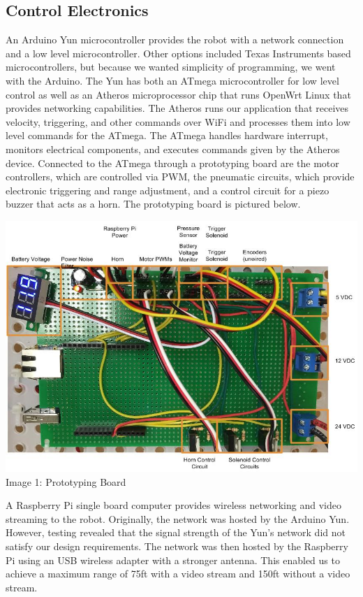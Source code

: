 \documentclass[letterpaper,12pt]{article}
\begin{document}
\subsection{Control Electronics}
An Arduino Yun microcontroller provides the robot with a network connection and
a low level microcontroller. Other options included Texas Instruments based
microcontrollers, but because we wanted simplicity of programming, we went with
the Arduino. The Yun has both an ATmega microcontroller for low level control
as well as an Atheros microprocessor chip that runs OpenWrt Linux that provides
networking capabilities. The Atheros runs our application that receives
velocity, triggering, and other commands over WiFi and processes them into low
level commands for the ATmega. The ATmega handles hardware interrupt, monitors
electrical components, and executes commands given by the Atheros device.
Connected to the ATmega through a prototyping board are the motor controllers,
which are controlled via PWM, the pneumatic circuits, which provide electronic
triggering and range adjustment, and a control circuit for a piezo buzzer that
acts as a horn. The prototyping board is pictured below.\\
\begin{center}
    \includegraphics[width=15cm]{./pics/electronics/AnnotatedProtoboard.jpg}\\
     Image 1: Prototyping Board
\end{center}

A Raspberry Pi single board computer provides wireless networking and video
streaming to the robot. Originally, the network was hosted by the Arduino Yun.
However, testing revealed that the signal strength of the Yun's network did not satisfy
our design requirements.  The network was then hosted by the Raspberry Pi using
an USB wireless adapter with a stronger antenna. This enabled us to achieve a maximum
range of 75ft with a video stream and 150ft without a video stream.
\end{document}
